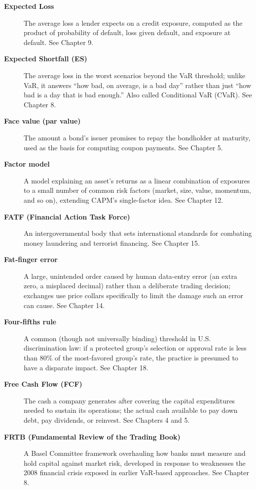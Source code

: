 \documentclass[../ai_in_finance]{subfiles}
\begin{document}
\begin{description}
\item[\textbf{Expected Loss}] The average loss a lender expects on a credit exposure, computed as the product of probability of default, loss given default, and exposure at default. See Chapter 9.

\item[\textbf{Expected Shortfall (ES)}] The average loss in the worst scenarios beyond the VaR threshold; unlike VaR, it answers ``how bad, on average, is a bad day'' rather than just ``how bad is a day that is bad enough.'' Also called Conditional VaR (CVaR). See Chapter 8.

\item[\textbf{Face value (par value)}] The amount a bond's issuer promises to repay the bondholder at maturity, used as the basis for computing coupon payments. See Chapter 5.

\item[\textbf{Factor model}] A model explaining an asset's returns as a linear combination of exposures to a small number of common risk factors (market, size, value, momentum, and so on), extending CAPM's single-factor idea. See Chapter 12.

\item[\textbf{FATF (Financial Action Task Force)}] An intergovernmental body that sets international standards for combating money laundering and terrorist financing. See Chapter 15.

\item[\textbf{Fat-finger error}] A large, unintended order caused by human data-entry error (an extra zero, a misplaced decimal) rather than a deliberate trading decision; exchanges use price collars specifically to limit the damage such an error can cause. See Chapter 14.

\item[\textbf{Four-fifths rule}] A common (though not universally binding) threshold in U.S. discrimination law: if a protected group's selection or approval rate is less than 80\% of the most-favored group's rate, the practice is presumed to have a disparate impact. See Chapter 18.

\item[\textbf{Free Cash Flow (FCF)}] The cash a company generates after covering the capital expenditures needed to sustain its operations; the actual cash available to pay down debt, pay dividends, or reinvest. See Chapters 4 and 5.

\item[\textbf{FRTB (Fundamental Review of the Trading Book)}] A Basel Committee framework overhauling how banks must measure and hold capital against market risk, developed in response to weaknesses the 2008 financial crisis exposed in earlier VaR-based approaches. See Chapter 8.


\end{description}
\end{document}
